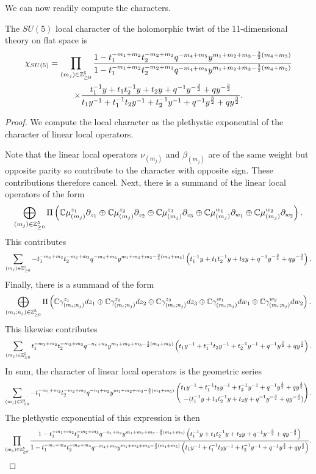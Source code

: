 We can now readily compute the characters.
\begin{prop}\label{prop:locchar}
The $SU(5)$ local character of the holomorphic twist of the 11-dimensional theory on flat space is
\begin{multline}
\chi_{SU(5)} = 
\prod_ {(m_j)\in \mathbb{Z}^5_{\geq 0}} \frac{1- t_1^{-m_1+m_2}t_2^{-m_2+m_3}q^{-m_4+m_5}y^{m_1+m_2+m_3-\frac 3 2 (m_4+m_5)}}{1- t_1^{-m_1+m_2}t_2^{-m_2+m_3}q^{-m_4+m_5}y^{m_1+m_2+m_3-\frac 3 2 (m_4+m_5)} }
\\ 
\times \frac{t_1^{-1}y + t_1t_2^{-1}y + t_2y + q^{-1}y^{-\frac 3 2} + qy^{-\frac 3 2}}{t_1y^{-1} + t_1^{-1}t_2y^{-1} + t_2^{-1}y^{-1} + q^{-1}y^{\frac 3 2} + qy^{\frac 3 2}}.
\end{multline}
\end{prop}
\begin{proof}
We compute the local character as the plethystic exponential of the character of linear local operators. 

Note that the linear local operators $ \nu_{(m_j)}$ and $\beta_{(m_j)}$ are of the same weight but opposite parity so contribute to the character with opposite sign. These contributions therefore cancel. Next, there is a summand of the linear local operators of the form 
\[
\bigoplus _{(m_j)\in \mathbb{Z}^5_{\geq 0 }} \Pi \left ( \mathbb{C}\mu^{z_1}_{(m_j)}\partial_{z_1}\oplus \mathbb{C}\mu^{z_2}_{(m_j)}\partial_{z_2}\oplus \mathbb{C}\mu^{z_3}_{(m_j)}\partial_{z_3}\oplus\mathbb{C}\mu^{w_1}_{(m_j)}\partial_{w_1}\oplus \mathbb{C}\mu^{w_2}_{(m_j)}\partial_{w_2}\right).
\] 
This contributes 
\[
\sum_{(m_j)\in \mathbb{Z}^5_{\geq 0 }}- t_1^{-m_1+m_2}t_2^{-m_2+m_3}q^{-m_4+m_5}y^{m_1+m_2+m_3-\frac 3 2 (m_4+m_5)}\left (t_1^{-1}y + t_1t_2^{-1}y + t_2y + q^{-1}y^{-\frac 3 2} + qy^{-\frac 3 2} \right).
\] 
Finally, there is a summand of the form 
\[
\bigoplus _{(m_i;n_j)\in \mathbb{Z}^5_{\geq 0 }} \Pi \left ( \mathbb{C}\gamma^{z_1}_{(m_i; n_j)}d{z_1}\oplus \mathbb{C}\gamma^{z_2}_{(m_i; n_j)}d{z_2}\oplus\mathbb{C}\gamma^{z_3}_{(m_i; n_j)}d{z_3}\oplus\mathbb{C}\gamma^{w_1}_{(m_i; n_j)}d{w_1}\oplus \mathbb{C}\gamma^{w_2}_{(m_i; n_j)}d {w_2}\right).
\] 
This likewise contributes 
\[
\sum_{(m_j)\in \mathbb{Z}^5_{\geq 0 }}t_1^{-m_1+m_2}t_2^{-m_2+m_3}q^{-n_1+n_2}y^{m_1+m_2+m_3-\frac 3 2 (m_4+m_5)}\left (t_1y^{-1} + t_1^{-1}t_2y^{-1} + t_2^{-1}y^{-1} + q^{-1}y^{\frac 3 2} + qy^{\frac 3 2} \right).
\] 
In sum, the character of linear local operators is the geometric series 
\[
\sum_{(m_j)\in \mathbb{Z}^5_{\geq 0 }}-t_1^{-m_1+m_2}t_2^{-m_2+m_3}q^{-n_1+n_2}y^{m_1+m_2+m_3-\frac 3 2 (m_4+m_5)}\left (\begin{aligned}t_1y^{-1} + t_1^{-1}t_2y^{-1} + t_2^{-1}y^{-1} + q^{-1}y^{\frac 3 2} + qy^{\frac 3 2} \\  - (t_1^{-1}y + t_1t_2^{-1}y + t_2y + q^{-1}y^{-\frac 3 2} + qy^{-\frac 3 2})\end{aligned}\right).
\] 
The plethystic exponential of this expression is then 
\[
\prod_ {(m_j)\in \mathbb{Z}^5_{\geq 0}}\frac{1- t_1^{-m_1+m_2}t_2^{-m_2+m_3}q^{-n_1+n_2}y^{m_1+m_2+m_3-\frac 3 2 (m_4+m_5)}\left (t_1^{-1}y + t_1t_2^{-1}y + t_2y + q^{-1}y^{-\frac 3 2} + qy^{-\frac 3 2} \right)}{1- t_1^{-m_1+m_2}t_2^{-m_2+m_3}q^{-m_4+m_5}y^{m_1+m_2+m_3-\frac 3 2 (m_4+m_5)}\left (t_1y^{-1} + t_1^{-1}t_2y^{-1} + t_2^{-1}y^{-1} + q^{-1}y^{\frac 3 2} + qy^{\frac 3 2} \right)}.
\]
\end{proof}
